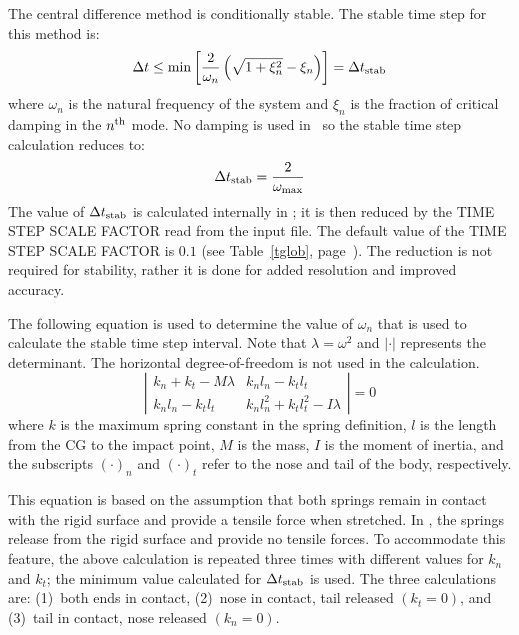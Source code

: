 The central difference method is conditionally stable.  The stable time
step for this method is:
\begin{displaymath}
\Delta t
\le\min\left[\frac{2}{\omega_n}\left(\sqrt{1+\xi^2_n}-\xi_n\right)\right]
= \Delta t_{\rm stab}
\end{displaymath}
where $\omega_n$ is the natural frequency of the system and $\xi_n$ is
the fraction of critical damping in the $n^{\rm th}$ mode. No damping
is used in \SLAP\ so the stable time step calculation reduces to:
\begin{displaymath}
\Delta t_{\rm stab} = \frac{2}{\omega_{\max}}
\end{displaymath}
The value of $\Delta t_{\rm stab}$ is calculated internally in \SLAP; it
is then reduced by the {\sf TIME STEP SCALE FACTOR} read from the input
file.  The default value of the {\sf TIME STEP SCALE FACTOR} is $0.1$
(see Table~\ref{tglob}, page~\pageref{tglob}).  The reduction is not
required for stability, rather it is done for added resolution and
improved accuracy.

The following equation is used to determine the value of $\omega_n$
that is used to calculate the stable time step interval.  Note that
$\lambda = \omega^2$ and $|\cdot|$ represents the determinant.  The
horizontal degree-of-freedom is not used in the calculation.
\begin{displaymath}
\left|\begin{array}{ll} k_n + k_t - M\lambda & k_n l_n - k_t l_t \\
                         k_n l_n - k_t l_t   & k_n l_n^2 + k_t l_t^2 - I\lambda
      \end{array}\right|
= 0
\end{displaymath}
where $k$ is the maximum spring constant in the spring definition, $l$
is the length from the CG to the impact point, $M$ is the mass, $I$ is
the moment of inertia, and the subscripts $(\cdot)_n$ and $(\cdot)_t$
refer to the nose and tail of the body, respectively.

This equation is based on the assumption that both springs remain in
contact with the rigid surface and provide a tensile force when
stretched.  In \SLAP, the springs release from the rigid surface and
provide no tensile forces.  To accommodate this feature, the above
calculation is repeated three times with different values for $k_n$ and
$k_t$; the minimum value calculated for $\Delta t_{\rm stab}$ is
used.  The three calculations are: (1)~both ends in contact, (2)~nose in
contact, tail released $(k_t=0)$, and (3)~tail in contact, nose released
$(k_n=0)$.

